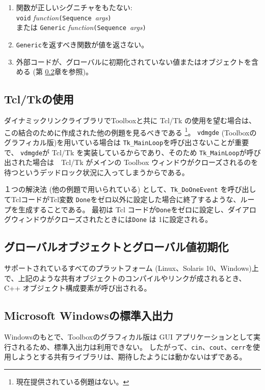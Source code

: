 \documentclass[\pformat,12pt]{jarticle}
\begin{document}
\begin{enumerate}
\item 関数が正しいシグニチャをもたない:\\  {\tt void} {\em function\/}{\tt (Sequence }{\em args\/}{\tt )}\\  または {\tt Generic} {\em function\/}{\tt (Sequence }{\em args\/}{\tt )}
\item  {\tt Generic}を返すべき関数が値を返さない。
\item 外部コードが、グローバルに初期化されていない値またはオブジェクトを含める (第 \ref{sec:globalvalues}章を参照)。
\end{enumerate}

\subsection{Tcl/Tkの使用}

ダイナミックリンクライブラリでToolboxと共に Tcl/Tk の使用を望む場合は、この結合のために作成された他の例題を見るべきである
\footnote{現在提供されている例題はない。}。 
{\tt vdmgde} (Toolboxのグラフィカル版)を用いている場合は {\tt Tk\_MainLoop}を呼び出さないことが重要で、 {\tt vdmgde}が Tcl/Tk を実装しているからであり、そのため {\tt Tk\_MainLoop}が呼び出された場合は　Tcl/Tk がメインの Toolbox ウィンドウがクローズされるのを待つというデッドロック状況に入ってしまうからである。

１つの解決法 (他の例題で用いられている) として、{\tt Tk\_DoOneEvent} を呼び出してTclコードがTcl変数 {\tt Done}をゼロ以外に設定した場合に終了するような、ループを生成することである。
最初は Tcl コードが{\tt Done}をゼロに設定し、ダイアログウィンドウがクローズされたときには{\tt Done} は 1に設定される。

\subsection{グローバルオブジェクトとグローバル値初期化}
\label{sec:globalvalues}

サポートされているすべてのプラットフォーム (Linux、Solaris 10、Windows)上で、上記のような共有オブジェクトのコンパイルやリンクが成されるとき、 C++ オブジェクト構成要素が呼び出される。

\subsection{Microsoft Windowsの標準入出力}

Windowsのもとで、Toolboxのグラフィカル版は GUI アプリケーションとして実行されるため、標準入出力は利用できない。
したがって、\texttt{cin}、\texttt{cout}、\texttt{cerr}を使用しようとする共有ライブラリは、期待したようには動かないはずである。
\end{document}
